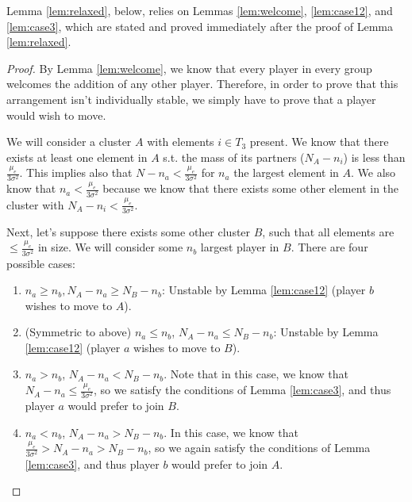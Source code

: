 \documentclass{article}
\newcommand{\mue}[0]{\ensuremath{\mu_e}}
\newcommand{\var}[0]{\ensuremath{\sigma^2}}
\newcommand{\ndraw}[0]{\ensuremath{n}}
\newcommand{\total}[0]{\ensuremath{N}}
\begin{document}
Lemma \ref{lem:relaxed}, below, relies on Lemmas \ref{lem:welcome}, \ref{lem:case12}, and \ref{lem:case3}, which are stated and proved immediately after the proof of Lemma \ref{lem:relaxed}. 
\relaxed*
\begin{proof}
By Lemma \ref{lem:welcome}, we know that every player in every group welcomes the addition of any other player. Therefore, in order to prove that this arrangement isn't individually stable, we simply have to prove that a player would wish to move. 


We will consider a cluster $A$ with elements $i \in T_3$ present. We know that there exists at least one element in $A$ s.t. the mass of its partners ($\total_A - \ndraw_i$) is less than $\frac{\mue}{3\var}$. This implies also that $\total - \ndraw_a < \frac{\mue}{3\var}$ for $\ndraw_a$ the largest element in $A$. We also know that $\ndraw_a < \frac{\mue}{3\var}$ because we know that there exists some other element in the cluster with $\total_A - \ndraw_i < \frac{\mue}{3\var}$. 

Next, let's suppose there exists some other cluster $B$, such that all elements are $\leq \frac{\mue}{3\var}$ in size. We will consider some $\ndraw_b$ largest player in $B$. There are four possible cases:  

\begin{enumerate}
    \item $\ndraw_a \geq \ndraw_b, \total_A - \ndraw_a \geq \total_B - \ndraw_b$: Unstable by Lemma \ref{lem:case12} (player $b$ wishes to move to $A$). 
    \item (Symmetric to above) $\ndraw_a \leq \ndraw_b$, $\total_A - \ndraw_a  \leq \total_B - \ndraw_b$: Unstable by Lemma \ref{lem:case12} (player $a$ wishes to move to $B$). 
    \item $\ndraw_a > \ndraw_b$, $\total_A - \ndraw_a < \total_B - \ndraw_b$. Note that in this case, we know that $\total_A - \ndraw_a \leq \frac{\mue}{3\var}$, so we satisfy the conditions of Lemma \ref{lem:case3}, and thus player $a$ would prefer to join $B$. 
    \item $\ndraw_a < \ndraw_b$, $\total_A- \ndraw_a > \total_B - \ndraw_b$. In this case, we know that $\frac{\mue}{3\var} > \total_A - \ndraw_a > \total_B -\ndraw_b$, so we again satisfy the conditions of Lemma \ref{lem:case3}, and thus player $b$ would prefer to join $A$.
    \end{enumerate}
\end{proof}
\end{document}
